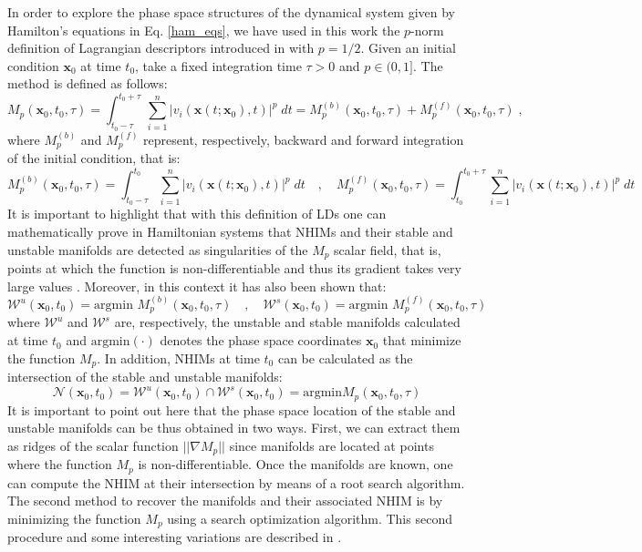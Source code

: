 \documentclass[8pt]{article}
\begin{document}
In order to explore the phase space structures of the dynamical system given by Hamilton's equations in Eq. \eqref{ham_eqs}, we have used in this work the $p$-norm definition of Lagrangian descriptors introduced in \cite{lopesino2017} with $p = 1/2$. Given an initial condition $\mathbf{x}_0$ at time $t_0$, take a fixed integration time $\tau > 0$ and $p \in (0,1]$. The method is defined as follows:
\begin{equation}
M_p(\mathbf{x}_{0},t_0,\tau) = \int^{t_0+\tau}_{t_0-\tau} \, \sum_{i=1}^{n} |v_{i}(\mathbf{x}(t;\mathbf{x}_0),t)|^p \; dt = M_p^{(b)}(\mathbf{x}_{0},t_0,\tau) + M_p^{(f)}(\mathbf{x}_{0},t_0,\tau) \;,
\label{Mp_function}
\end{equation}
where $M_p^{(b)}$ and $M_p^{(f)}$ represent, respectively, backward and forward integration of the initial condition, that is:
\begin{equation}
M_p^{(b)}(\mathbf{x}_{0},t_0,\tau) = \int^{t_0}_{t_0-\tau} \sum_{i=1}^{n} |v_{i}(\mathbf{x}(t;\mathbf{x}_0),t)|^p \; dt \quad,\quad M_p^{(f)}(\mathbf{x}_{0},t_0,\tau) = \int^{t_0+\tau}_{t_0} \sum_{i=1}^{n} |v_{i}(\mathbf{x}(t;\mathbf{x}_0),t)|^p \; dt
\end{equation}
It is important to highlight that with this definition of LDs one can mathematically prove in Hamiltonian systems that NHIMs and their stable and unstable manifolds are detected as singularities of the $M_p$ scalar field, that is, points at which the function is non-differentiable and thus its gradient takes very large values \cite{lopesino2017,demian2017,naik2019a}. Moreover, in this context it has also been shown that:
\begin{equation}
\mathcal{W}^u(\mathbf{x}_{0},t_0) = \textrm{argmin } M_p^{(b)}(\mathbf{x}_{0},t_0,\tau) \quad,\quad \mathcal{W}^s(\mathbf{x}_{0},t_0) = \textrm{argmin } M_p^{(f)}(\mathbf{x}_{0},t_0,\tau)
\label{min_LD_manifolds}
\end{equation}
where $\mathcal{W}^u$ and $\mathcal{W}^s$ are, respectively, the unstable and stable manifolds calculated at time $t_0$ and $\textrm{argmin}(\cdot)$ denotes the phase space coordinates $\mathbf{x}_0$ that minimize the function $M_p$. In addition, NHIMs at time $t_0$ can be calculated as the intersection of the stable and unstable manifolds:
\begin{equation}
\mathcal{N}(\mathbf{x}_{0},t_0) = \mathcal{W}^u(\mathbf{x}_{0},t_0) \cap \mathcal{W}^s(\mathbf{x}_{0},t_0) = \textrm{argmin} M_p(\mathbf{x}_{0},t_0,\tau)
\label{min_NHIM_LD}
\end{equation}
It is important to point out here that the phase space location of the stable and unstable manifolds can be thus obtained in two ways. First, we can extract them as ridges of the scalar function $||\nabla M_p||$ since manifolds are located at points where the function $M_p$ is non-differentiable. Once the manifolds are known, one can compute the NHIM at their intersection by means of a root search algorithm. The second method to recover the manifolds and their associated NHIM is by minimizing the function $M_p$ using a search optimization algorithm. This second procedure and some interesting variations are described in \cite{feldmaier2019}.
\end{document}
